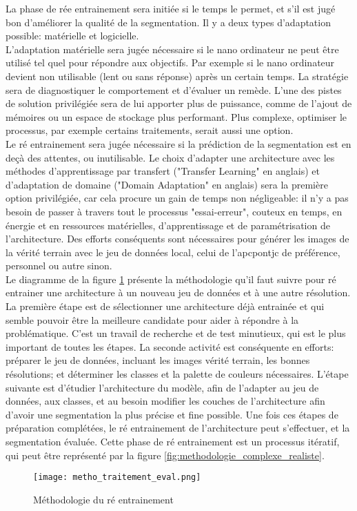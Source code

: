 ﻿\noindent La phase de rée entrainement sera initiée si le temps le permet, et s'il est jugé bon d'améliorer la qualité de la segmentation. Il y a deux types d'adaptation possible: matérielle et logicielle.
\vspace{\baselineskip}
\\
\noindent L'adaptation matérielle sera jugée nécessaire si le nano ordinateur ne peut être utilisé tel quel pour répondre aux objectifs. Par exemple si le nano ordinateur devient non utilisable (lent ou sans réponse) après un certain temps. La stratégie sera de diagnostiquer le comportement et d'évaluer un remède. L'une des pistes de solution privilégiée sera de lui apporter plus de puissance, comme de l'ajout de mémoires ou un espace de stockage plus performant. Plus complexe, optimiser le processus, par exemple certains traitements, serait aussi une option.
\vspace{\baselineskip}
\\
\noindent Le ré entrainement sera jugée nécessaire si la prédiction de la segmentation est en deçà des attentes, ou inutilisable. Le choix d'adapter une architecture avec les méthodes d'apprentissage par transfert ("Transfer Learning" en anglais) et d'adaptation de domaine ("Domain Adaptation" en anglais) sera la première option privilégiée, car cela procure un gain de temps non négligeable: il n'y a pas besoin de passer à travers tout le processus "essai-erreur", couteux en temps, en énergie et en ressources matérielles, d'apprentissage et de paramétrisation de l'architecture. Des efforts conséquents sont nécessaires pour générer les images de la vérité terrain avec le jeu de données local, celui de l'\acrshort{apcpontjc} de préférence, personnel ou autre sinon.
\vspace{\baselineskip}
\\
\noindent Le diagramme de la figure \ref{fig:metho_adaptation} présente la méthodologie qu'il faut suivre pour ré entrainer une architecture à un nouveau jeu de données et à une autre résolution. La première étape est de sélectionner une architecture déjà entrainée et qui semble pouvoir être la meilleure candidate pour aider à répondre à la problématique. C'est un travail de recherche et de test minutieux, qui est le plus important de toutes les étapes. La seconde activité est conséquente en efforts: préparer le jeu de données, incluant les images vérité terrain, les bonnes résolutions; et déterminer les classes et la palette de couleurs nécessaires. L'étape suivante est d'étudier l'architecture du modèle, afin de l'adapter au jeu de données, aux classes, et au besoin modifier les couches de l'architecture afin d'avoir une segmentation la plus précise et fine possible. Une fois ces étapes de préparation complétées, le ré entrainement de l'architecture peut s'effectuer, et la segmentation évaluée. Cette phase de ré entrainement est un processus itératif, qui peut être représenté par la figure \ref{fig:methodologie_complexe_realiste}.
\label{metho_adaptation}
\begin{figure}[H]
    \centering
    \texttt{[image: metho\_traitement\_eval.png]}
    \caption{Méthodologie du ré entrainement}
    \label{fig:metho_adaptation}
\end{figure}